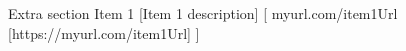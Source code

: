 \documentclass[
]{llresume}
\begin{document}
\begin{mainpane}
        \begin{mainsection}
            {Extra section} %
                    \entryGeneric
                    {Item 1} %
                    [Item 1 description] %
                        [
                            \infoGeneric
                            {\faGlobe}%
                            {myurl.com/item1Url}%
                            [https://myurl.com/item1Url] %
                        ]
        \end{mainsection}

\end{mainpane}
\end{document}
